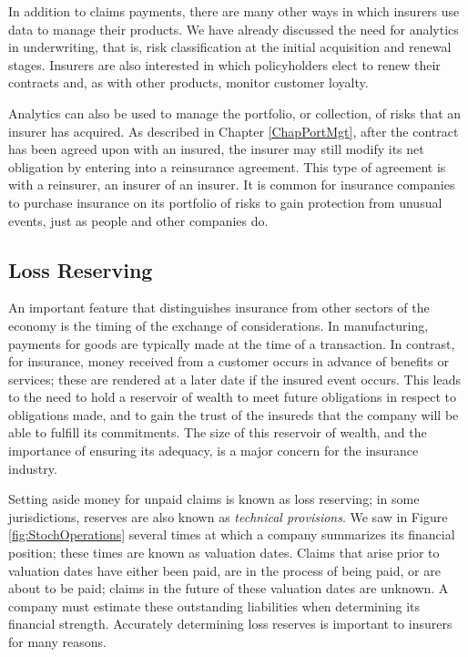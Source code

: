 \documentclass[
]{book}
\begin{document}
In addition to claims payments, there are many other ways in which insurers use data to manage their products. We have already discussed
the need for analytics in underwriting, that is, risk classification at the initial acquisition and renewal stages. Insurers are also interested in which policyholders elect to renew their contracts and, as with other products, monitor customer loyalty.

Analytics can also be used to manage the portfolio, or collection, of risks that an insurer has acquired. As described in Chapter \ref{ChapPortMgt}, after the contract has been agreed upon with an insured, the insurer may still modify its net obligation by entering into a reinsurance agreement. This type of agreement is with a reinsurer, an insurer of an insurer. It is common for insurance companies to purchase insurance on its portfolio of risks to gain protection from unusual events, just as people and other companies do.

\hypertarget{S:Reserving}{%
\subsection{Loss Reserving}\label{S:Reserving}}

An important feature that distinguishes insurance from other sectors of the economy is the timing of the exchange of considerations. In manufacturing, payments for goods are typically made at the time of a transaction. In contrast, for insurance, money received from a customer occurs in advance of benefits or services; these are rendered at a later date if the insured event occurs. This leads to the need to hold a reservoir of wealth to meet future obligations in respect to obligations made, and to gain the trust of the insureds that the company will be able to fulfill its commitments. The size of this reservoir of wealth, and the importance of ensuring its adequacy, is a major concern for the insurance industry.

Setting aside money for unpaid claims is known as loss reserving; in some jurisdictions, reserves are also known as \emph{technical provisions}. We saw in Figure \ref{fig:StochOperations} several times at which a company summarizes its financial position; these times are known as valuation dates. Claims that arise prior to valuation dates have either been paid, are in the process of being paid, or are about to be paid; claims in the future of these valuation dates are unknown. A company must estimate these outstanding liabilities when determining its financial strength. Accurately determining loss reserves is important to insurers for many reasons.
\end{document}
